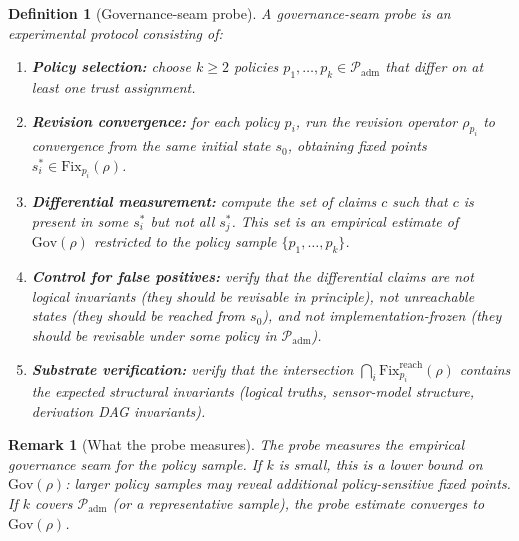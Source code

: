 \documentclass[11pt]{article}
\newtheorem{definition}{Definition}
\newtheorem{remark}{Remark}
\newcommand{\Gov}{\mathrm{Gov}}
\newcommand{\Fix}{\mathrm{Fix}}
\newcommand{\Padm}{\mathcal{P}_{\mathrm{adm}}}
\begin{document}
\begin{definition}[Governance-seam probe]
\label{def:gov-probe}
A \emph{governance-seam probe} is an experimental protocol consisting of:
\begin{enumerate}
  \item \textbf{Policy selection:} choose $k \geq 2$ policies $p_1, \ldots, p_k \in \Padm$
        that differ on at least one trust assignment.
  \item \textbf{Revision convergence:} for each policy $p_i$, run the revision operator
        $\rho_{p_i}$ to convergence from the same initial state $s_0$, obtaining fixed points
        $s_i^* \in \Fix_{p_i}(\rho)$.
  \item \textbf{Differential measurement:} compute the set of claims $c$ such that $c$ is
        present in some $s_i^*$ but not all $s_j^*$. This set is an empirical estimate of
        $\Gov(\rho)$ restricted to the policy sample $\{p_1, \ldots, p_k\}$.
  \item \textbf{Control for false positives:} verify that the differential claims are not
        logical invariants (they should be revisable in principle), not unreachable states
        (they should be reached from $s_0$), and not implementation-frozen (they should be
        revisable under some policy in $\Padm$).
  \item \textbf{Substrate verification:} verify that the intersection $\bigcap_i
        \Fix_{p_i}^{\mathrm{reach}}(\rho)$ contains the expected structural invariants
        (logical truths, sensor-model structure, derivation DAG invariants).
\end{enumerate}
\end{definition}

\begin{remark}[What the probe measures]
The probe measures the \emph{empirical} governance seam for the policy sample. If $k$ is small,
this is a lower bound on $\Gov(\rho)$: larger policy samples may reveal additional
policy-sensitive fixed points. If $k$ covers $\Padm$ (or a representative sample), the probe
estimate converges to $\Gov(\rho)$.
\end{remark}
\end{document}
